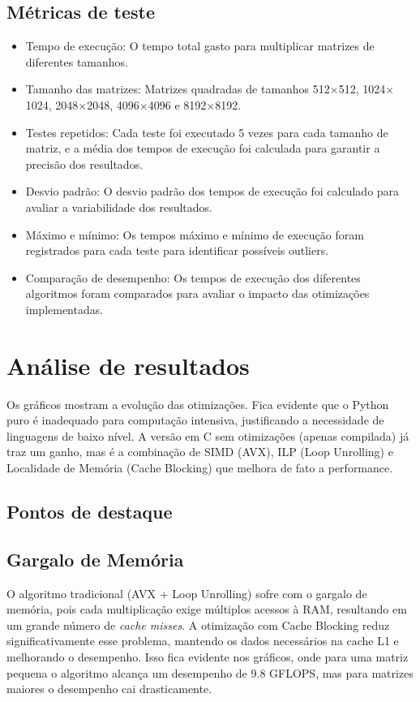\documentclass[12pt]{article}
\begin{document}
\subsection{Métricas de teste}
\begin{itemize}
    \item Tempo de execução: O tempo total gasto para multiplicar matrizes de diferentes tamanhos.
    \item Tamanho das matrizes: Matrizes quadradas de tamanhos 512$\times$512, 1024$\times$1024, 2048$\times$2048, 4096$\times$4096 e 8192$\times$8192.
    \item Testes repetidos: Cada teste foi executado 5 vezes para cada tamanho de matriz, e a média dos tempos de execução foi calculada para garantir a precisão dos resultados.
    \item Desvio padrão: O desvio padrão dos tempos de execução foi calculado para avaliar a variabilidade dos resultados.
    \item Máximo e mínimo: Os tempos máximo e mínimo de execução foram registrados para cada teste para identificar possíveis outliers.
    \item Comparação de desempenho: Os tempos de execução dos diferentes algoritmos foram comparados para avaliar o impacto das otimizações implementadas.
\end{itemize}

\section{Análise de resultados}

Os gráficos mostram a evolução das otimizações. Fica evidente que o Python puro é inadequado para computação intensiva, justificando a necessidade de linguagens de baixo nível. A versão em C sem otimizações (apenas compilada) já traz um ganho, mas é a combinação de SIMD (AVX), ILP (Loop Unrolling) e Localidade de Memória (Cache Blocking) que melhora de fato a performance.

\subsection*{Pontos de destaque}
\subsection{Gargalo de Memória}
O algoritmo tradicional (AVX + Loop Unrolling) sofre com o gargalo de memória, pois cada multiplicação exige múltiplos acessos à RAM, resultando em um grande número de \textit{cache misses}. A otimização com Cache Blocking reduz significativamente esse problema, mantendo os dados necessários na cache L1 e melhorando o desempenho. Isso fica evidente nos gráficos, onde para uma matriz pequena o algoritmo alcança um desempenho de 9.8 GFLOPS, mas para matrizes maiores o desempenho cai drasticamente.
\end{document}
